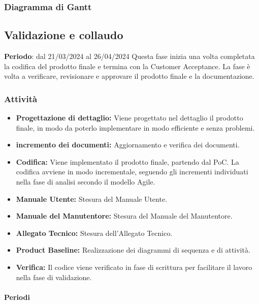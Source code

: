 \newpage 
\subsubsection{Diagramma di Gantt}\label{sec:pianificazione:progCodifica:gantt}


\subsection{Validazione e collaudo}\label{sec:pianificazione:val_collaudo}

\textbf{Periodo}: dal 21/03/2024 al 26/04/2024
Questa fase inizia una volta completata la codifica del prodotto finale e termina con la Customer Acceptance. La fase è volta a verificare, revisionare e approvare il prodotto finale e la documentazione.

\subsubsection{Attività}\label{sec:pianificazione:prog_codifica:attivita}
\begin{itemize}
    \item \textbf{Progettazione di dettaglio:} Viene progettato nel dettaglio il prodotto finale, in modo da poterlo implementare in modo efficiente e senza problemi. 
    \item \textbf{incremento dei documenti:} Aggiornamento e verifica dei documenti.
    \item \textbf{Codifica:} Viene implementato il prodotto finale, partendo dal PoC. La codifica avviene in modo incrementale, seguendo gli incrementi individuati nella fase di analisi secondo il modello Agile.
    \item \textbf{Manuale Utente:} Stesura del Manuale Utente.
    \item \textbf{Manuale del Manutentore:} Stesura del Manuale del Manutentore.
    \item \textbf{Allegato Tecnico:} Stesura dell'Allegato Tecnico.
    \item \textbf{Product Baseline:} Realizzazione dei diagrammi di sequenza e di attività.
    \item \textbf{Verifica:} Il codice viene verificato in fase di scrittura per facilitare il lavoro nella fase di validazione.
\end{itemize}

\paragraph{Periodi}\label{sec:pianificazione:prog_codifica:periodi:primo}

